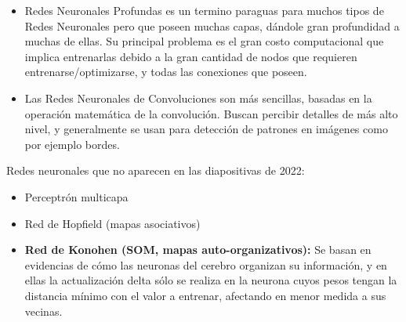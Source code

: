 \begin{itemize}
    \item Redes Neuronales Profundas es un termino paraguas para muchos tipos de Redes Neuronales pero que poseen muchas capas, dándole gran profundidad a muchas de ellas. Su principal problema es el gran costo computacional que implica entrenarlas debido a la gran cantidad de nodos que requieren entrenarse/optimizarse, y todas las conexiones que poseen.
    \item Las Redes Neuronales de Convoluciones son más sencillas, basadas en la operación matemática de la convolución. Buscan percibir  detalles de más alto nivel, y generalmente se usan para detección de patrones en imágenes como por  ejemplo bordes.
\end{itemize}

Redes neuronales que no aparecen en las diapositivas de 2022:

\begin{itemize}
    \item Perceptrón multicapa
    \item Red de Hopfield (mapas asociativos)
    \item \textbf{Red de Konohen (SOM, mapas auto-organizativos):} Se basan en evidencias de cómo las neuronas del cerebro organizan su información, y en ellas la actualización delta sólo se realiza en la neurona cuyos pesos tengan la distancia mínimo con el valor a entrenar, afectando en menor medida a sus vecinas.
\end{itemize}

